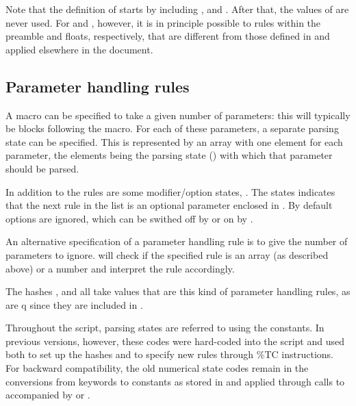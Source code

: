 \documentclass{article}
\newcommand\wild{\ldots}
\begin{document}
Note that the definition of  starts by including ,  and . After that, the values of  are never used. For  and , however, it is in principle possible to rules within the preamble and floats, respectively, that are different from those defined in  and applied elsewhere in the document.


\subsection{Parameter handling rules}

A macro can be specified to take a given number of parameters: this will typically be \code{\{\ldots\}} blocks following the macro. For each of these parameters, a separate parsing state can be specified. This is represented by an array with one element for each parameter, the elements being the parsing state (\code{\$STATE_\wild}) with which that parameter should be parsed.

In addition to the \code{\$STATE_\wild} rules are some modifier/option states, \code{\$_STATE_\wild}. The  states indicates that the next rule in the list is an optional parameter enclosed in \code{[]}. By default \code{[]} options are ignored, which can be swithed off by  or on by .

An alternative specification of a parameter handling rule is to give the number of parameters to ignore. \TeXcount{} will check if the specified rule is an array (as described above) or a number and interpret the rule accordingly.

The hashes ,  and  all take values that are this kind of parameter handling rules, as are q since they are included in .

Throughout the script, parsing states are referred to using the \code{\$STATE_\wild} constants. In previous versions, however, these codes were hard-coded into the script and used both to set up the hashes and to specify new rules through \%TC instructions. For backward compatibility, the old numerical state codes remain in the conversions from keywords to \code{\$STATE_\wild} constants as stored in  and applied through calls to  accompanied by  or .
\end{document}
